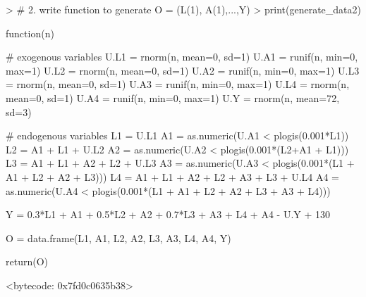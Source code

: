 \documentclass{exam}
\begin{document}
\begin{solution}

\begin{Schunk}
\end{Schunk}

\begin{Schunk}
\begin{Sinput}
> # 2. write function to generate O = (L(1), A(1),...,Y)
> print(generate_data2)
\end{Sinput}
\begin{Soutput}
function(n) {
  
  # exogenous variables
  U.L1 = rnorm(n, mean=0, sd=1)
  U.A1 = runif(n, min=0, max=1)
  U.L2 = rnorm(n, mean=0, sd=1)
  U.A2 = runif(n, min=0, max=1)
  U.L3 = rnorm(n, mean=0, sd=1)
  U.A3 = runif(n, min=0, max=1)
  U.L4 = rnorm(n, mean=0, sd=1)
  U.A4 = runif(n, min=0, max=1)
  U.Y = rnorm(n, mean=72, sd=3)
  
  # endogenous variables
  L1 = U.L1
  A1 = as.numeric(U.A1 < plogis(0.001*L1))
  L2 = A1 + L1 + U.L2
  A2 = as.numeric(U.A2 < plogis(0.001*(L2+A1 + L1)))
  L3 = A1 + L1 + A2 + L2 + U.L3
  A3 = as.numeric(U.A3 < plogis(0.001*(L1 + A1 + L2 + A2 + L3)))
  L4 = A1 + L1 + A2 + L2 + A3 + L3 + U.L4
  A4 = as.numeric(U.A4 < plogis(0.001*(L1 + A1 + L2 + A2 + L3 + A3 + L4))) 
  
  Y = 0.3*L1 + A1 + 0.5*L2 + A2 + 0.7*L3 + A3 + L4 + A4 - U.Y + 130
  
  O = data.frame(L1, A1, L2, A2, L3, A3, L4, A4, Y)
  
  return(O)
}
<bytecode: 0x7fd0c0635b38>
\end{Soutput}
\end{Schunk}

\begin{Schunk}
\end{Schunk}


\end{solution}
\end{document}
